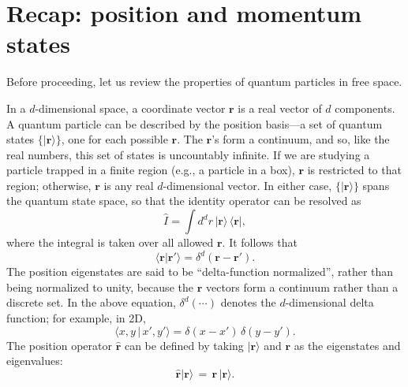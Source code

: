 \documentclass[pra,12pt]{revtex4}
\begin{document}
\section{Recap: position and momentum states}

Before proceeding, let us review the properties of quantum particles
in free space.

In a $d$-dimensional space, a coordinate vector $\mathbf{r}$ is a real
vector of $d$ components.  A quantum particle can be described by the
position basis---a set of quantum states $\{|\mathbf{r}\rangle\}$, one
for each possible $\mathbf{r}$.  The $\mathbf{r}$'s form a continuum,
and so, like the real numbers, this set of states is uncountably
infinite.  If we are studying a particle trapped in a finite region
(e.g., a particle in a box), $\mathbf{r}$ is restricted to that
region; otherwise, $\mathbf{r}$ is any real $d$-dimensional vector.
In either case, $\{|\mathbf{r}\rangle\}$ spans the quantum
state space, so that the identity operator can be resolved as
\begin{equation}
  \hat{I} = \int d^dr \, |\mathbf{r}\rangle \,\langle\mathbf{r}|,
\end{equation}
where the integral is taken over all allowed $\mathbf{r}$.  It
follows that
\begin{equation}
  \langle \mathbf{r} | \mathbf{r}' \rangle = \delta^d(\mathbf{r}-\mathbf{r}').
\end{equation}
The position eigenstates are said to be ``delta-function normalized'',
rather than being normalized to unity, because the $\mathbf{r}$
vectors form a continuum rather than a discrete set.  In the above
equation, $\delta^d(\cdots)$ denotes the $d$-dimensional delta
function; for example, in 2D,
\begin{equation}
  \langle x,y \,|\, x',y' \rangle = \delta(x-x') \, \delta(y-y').
\end{equation}
The position operator $\hat{\mathbf{r}}$ can be defined by taking
$|\mathbf{r}\rangle$ and $\mathbf{r}$ as the eigenstates and
eigenvalues:
\begin{equation}
  \hat{\mathbf{r}} |\mathbf{r}\rangle \,=\, \mathbf{r}\, |\mathbf{r}\rangle.
\end{equation}
\end{document}
